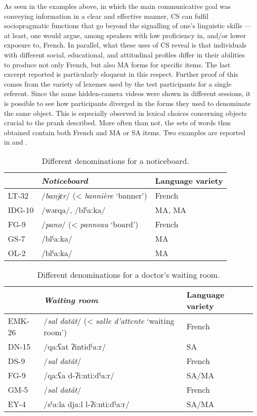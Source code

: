 \documentclass[output=paper]{langscibook}
\begin{document}
As seen in the examples above, in which the main communicative goal was conveying information in a clear and effective manner, \gls*{CS} can fulfil sociopragmatic functions that go beyond the signalling of one’s linguistic skills — at least, one would argue, among speakers with low proficiency in, and/or lower exposure to, French. In parallel, what these uses of \gls*{CS} reveal is that individuals with different social, educational, and attitudinal profiles differ in their abilities to produce not only French, but also \gls*{MA} forms for specific items. The last excerpt reported is particularly eloquent in this respect. Further proof of this comes from the variety of lexemes used by the test participants for a single referent. Since the same hidden-camera videos were shown in different sessions, it is possible to see how participants diverged in the forms they used to denominate the same object. This is especially observed in lexical choices concerning objects crucial to the prank described. More often than not, the sets of words thus obtained contain both French and \gls*{MA} or \gls*{SA} items. Two examples are reported in  and .

\begin{table}
	\begin{tabularx}{\textwidth}{lXl}\midrule\toprule
		& \textbf{\textit{Noticeboard}} & \textbf{Language variety} \\\midrule
		LT-32 & /\textit{banjɛr}/ (< \textit{bannière} ‘banner’) & French \\
		IDG-10 & /wǝrqa/, /blˁa:ka/ & \gls*{MA}, \gls*{MA} \\
		FG-9 & /\textit{pano}/ (< \textit{panneau} ‘board’) & French \\
		GS-7 & /blˁa:ka/ & \gls*{MA} \\
		OL-2 & /blˁa:ka/ & \gls*{MA} \\ \bottomrule \midrule
	\end{tabularx}
	\caption{Different denominations for a noticeboard.}
	\label{falchetta:tab:4}
\end{table}

\begin{table}
	\begin{tabularx}{\textwidth}{lXl}\midrule\toprule
		& \textbf{\textit{Waiting room}} & \textbf{Language variety} \\\midrule
		EMK-26 & /\textit{sal datãt}/ (< \textit{salle d’attente} ‘waiting room’) & French \\
		DN-15 & /qa:ʕat ʔintidˁa:r/ & \gls*{SA} \\
		DS-9 & /\textit{sal datãt}/ & French \\
		FG-9 & /qa:ʕa d-ʔi:nti:dˁa:r/ & \gls*{SA}/\gls*{MA} \\
		GM-5 & /\textit{sal datãt}/ & French \\
		EY-4 & /sˁa:la dja:l l-ʔi:nti:dˁa:r/ & \gls*{SA}/\gls*{MA} \\ \bottomrule\midrule
	\end{tabularx}
	\caption{Different denominations for a doctor’s waiting room.}
	\label{falchetta:tab:5}
\end{table}
\end{document}
